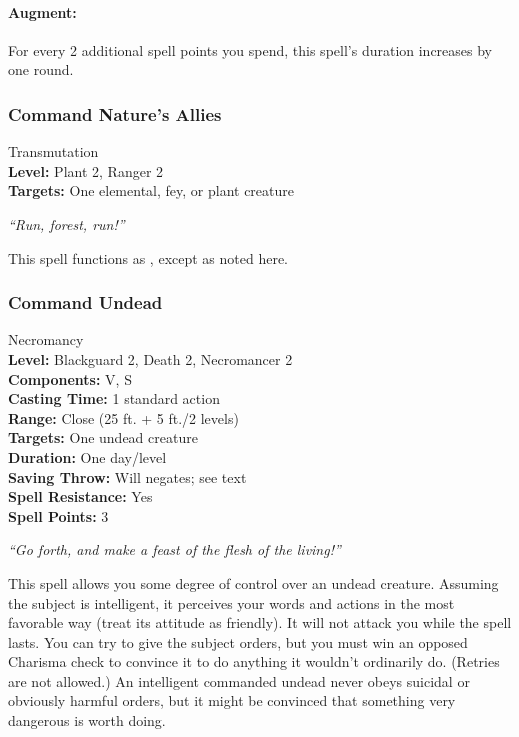\paragraph{Augment:} For every 2 additional spell points you spend, this spell's duration increases by one round.
\subsubsection{Command Nature's Allies}
\label{Spell:CommandNaturesAllies}
Transmutation
\\ \textbf{Level:} Plant 2, Ranger 2
\\ \textbf{Targets:} One elemental, fey, or plant creature

\emph{``Run, forest, run!''}

This spell functions as , except as noted here.
\subsubsection{Command Undead}
\label{Spell:CommandUndead}
Necromancy
\\ \textbf{Level:} Blackguard 2, Death 2, Necromancer 2
\\ \textbf{Components:} V, S
\\ \textbf{Casting Time:} 1 standard action
\\ \textbf{Range:} Close (25 ft. + 5 ft./2 levels)
\\ \textbf{Targets:} One undead creature
\\ \textbf{Duration:} One day/level
\\ \textbf{Saving Throw:} Will negates; see text
\\ \textbf{Spell Resistance:} Yes
\\ \textbf{Spell Points:} 3

\emph{``Go forth, and make a feast of the flesh of the living!''}

This spell allows you some degree of control over an undead creature. 
Assuming the subject is intelligent, it perceives your words and actions in the most favorable way (treat its attitude as friendly). 
It will not attack you while the spell lasts. 
You can try to give the subject orders, but you must win an opposed Charisma check to convince it to do anything it wouldn't ordinarily do. (Retries are not allowed.) 
An intelligent commanded undead never obeys suicidal or obviously harmful orders, but it might be convinced that something very dangerous is worth doing.

